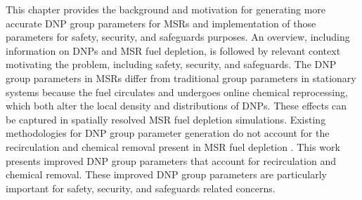 This chapter provides the background and motivation for generating more accurate \gls{DNP} group parameters for \glspl{MSR} and implementation of those parameters for safety, security, and safeguards purposes.
An overview, including information on \glspl{DNP} and \gls{MSR} fuel depletion, is followed by relevant context motivating the problem, including safety, security, and safeguards.
The \gls{DNP} group parameters in \glspl{MSR} differ from traditional group parameters in stationary systems because the fuel circulates and undergoes online chemical reprocessing, which both alter the local density and distributions of \glspl{DNP}.
These effects can be captured in spatially resolved \gls{MSR} fuel depletion simulations.
Existing methodologies for \gls{DNP} group parameter generation do not account for the recirculation and chemical removal present in \gls{MSR} fuel depletion \cite{keepin1957delayed, tuttle1975delayed, manero1972status, benedetti1982delayed, waldo1981delayed, brady1988evaluation, hughes1948delayed, loaiza1998measurements, loaiza2000dominant, pfeiffer2002status, d2002review, pfeiffer2002status, rudstam2002delayed, wilson2002delayed, brady1989delayed, leconte2020new}.
This work presents improved \gls{DNP} group parameters that account for recirculation and chemical removal.
These improved \gls{DNP} group parameters are particularly important for safety, security, and safeguards related concerns.
